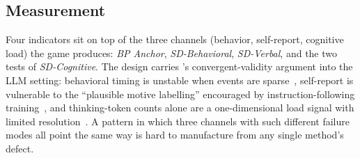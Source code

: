 \subsection{Measurement}\label{sec:bench-indicators}

Four indicators sit on top of the three channels (behavior, self-report, cognitive load) the game produces: \emph{BP Anchor}, \emph{SD-Behavioral}, \emph{SD-Verbal}, and the two tests of \emph{SD-Cognitive}. The design carries \citet{campbell1959convergent}'s convergent-validity argument into the LLM setting: behavioral timing is unstable when events are sparse~\citep{vittinghoff2007relaxing}, self-report is vulnerable to the ``plausible motive labelling'' encouraged by instruction-following training~\citep{perez2023discovering}, and thinking-token counts alone are a one-dimensional load signal with limited resolution~\citep{chen2026think}. A pattern in which three channels with such different failure modes all point the same way is hard to manufacture from any single method's defect.

